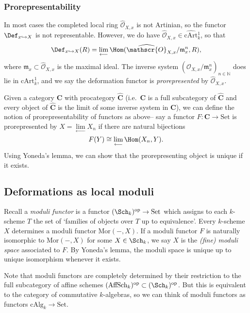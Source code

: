 \subsubsection{Prorepresentability} In most cases the completed local ring
\(\widehat{\mathscr{O}}_{X,x}\) is not Artinian, so the functor
\(\Def_{x\hookrightarrow X}\) is not representable.  However, we do have
\(\widehat{\mathscr{O}}_{X,x}\in \widehat{\text{cArt}}{}^1_k \), so that 
\[\Def_{x\hookrightarrow X}(R) = \lim_{\longleftarrow}
\Hom(\widehat{\mathscr{O}}_{X,x}/\mathfrak{m}_x^n,
R),\]
where \(\mathfrak{m}_x\subset \widehat{\mathscr{O}}_{X,x}\) is the maximal
ideal. The inverse system \((\widehat{\mathscr{O}}_{X,x}/\mathfrak{m}_x^n)_{n\in
\mathbb{N}}\) does lie in \(\text{cArt}^1_k\), and we say the deformation
functor is \textit{prorepresented} by \(\widehat{\mathscr{O}}_{X,x}\). 

Given a category \(\mathbf{C}\) with procategory \(\widehat{\mathbf{C}}\) (i.e.\
\(\mathbf{C}\) is a full subcategory of \(\mathbf{\widehat{C}}\) and every object of
\(\widehat{\mathbf{C}}\) is the limit of some inverse system in \(\mathbf{C}\)),
we can define the notion of prorepresentability of functors as above-- say a
functor \(F: \mathbf{C}\rightarrow \text{Set}\) is prorepresented by
\(X=\underset{\leftarrow}{\lim}X_n\) if there are natural bijections \[F(Y) \cong
\lim_{\longleftarrow}\Hom(X_n,Y).\]  
Using Yoneda's lemma, we can show that the prorepresenting object is unique if it
exists. 

\subsection{Deformations as local moduli}
Recall a \textit{moduli functor} is a functor \((\Sch_k)^\text{op}\rightarrow
\text{Set}\) which assigns to each \(k\)-scheme \(T\) the set of `families of
objects over \(T\) up to equivalence'. Every \(k\)-scheme \(X\) determines a
moduli functor \(\text{Mor}(-,X)\). If a moduli functor \(F\) is naturally
isomorphic to \(\text{Mor}(-,X)\) for some \(X\in \Sch_k\), we say \(X\) is the
\textit{(fine) moduli space} associated to \(F\). By Yoneda's lemma, the moduli
space is unique up to unique isomorphism whenever it exists. 

Note that moduli functors are completely determined by their restriction to the
full subcategory of affine schemes \((\text{AffSch}_k)^\text{op}\subset
(\Sch_k)^\text{op}\). But this is equivalent to the category of commutative
\(k\)-algebras, so we can think of moduli functors as functors 
\(\text{cAlg}_k\rightarrow \text{Set}.\)  

